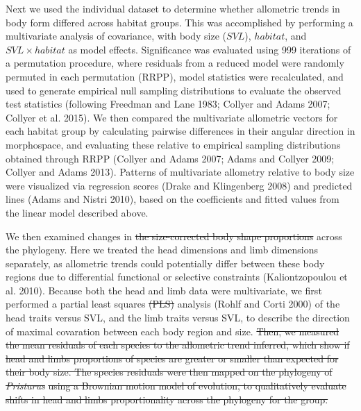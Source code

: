 \documentclass[
  11pt,
]{article}
\providecommand{\DIFaddtex}[1]{{\protect\color{blue}\uwave{#1}}} %
\providecommand{\DIFdeltex}[1]{{\protect\color{red}\sout{#1}}}                      %
\providecommand{\DIFaddbegin}{} %
\providecommand{\DIFaddend}{} %
\providecommand{\DIFdelbegin}{} %
\providecommand{\DIFdelend}{} %
\providecommand{\DIFadd}[1]{\texorpdfstring{\DIFaddtex{#1}}{#1}} %
\providecommand{\DIFdel}[1]{\texorpdfstring{\DIFdeltex{#1}}{}} %
\newcommand{\DIFscaledelfig}{0.5}
\newlength{\DIFdelgraphicswidth} %
\newlength{\DIFdelgraphicsheight} %
\newcommand{\DIFaddincludegraphics}[2][]{{\color{blue}\fbox{\DIFOincludegraphics[#1]{#2}}}} %
\newcommand{\DIFdelincludegraphics}[2][]{%
\sbox{\DIFdelgraphicsbox}{\DIFOincludegraphics[#1]{#2}}%
\settoboxwidth{\DIFdelgraphicswidth}{\DIFdelgraphicsbox} %
\settoboxtotalheight{\DIFdelgraphicsheight}{\DIFdelgraphicsbox} %
\scalebox{\DIFscaledelfig}{%
\parbox[b]{\DIFdelgraphicswidth}{\usebox{\DIFdelgraphicsbox}\\[-\baselineskip] \rule{\DIFdelgraphicswidth}{0em}}\llap{\resizebox{\DIFdelgraphicswidth}{\DIFdelgraphicsheight}{%
\setlength{\unitlength}{\DIFdelgraphicswidth}%
\begin{picture}(1,1)%
\thicklines\linethickness{2pt} %
{\color[rgb]{1,0,0}\put(0,0){\framebox(1,1){}}}%
{\color[rgb]{1,0,0}\put(0,0){\line( 1,1){1}}}%
{\color[rgb]{1,0,0}\put(0,1){\line(1,-1){1}}}%
\end{picture}%
}\hspace*{3pt}}} %
} %
\DeclareRobustCommand{\DIFaddbegin}{\DIFOaddbegin \let\includegraphics\DIFaddincludegraphics} %
\DeclareRobustCommand{\DIFaddend}{\DIFOaddend \let\includegraphics\DIFOincludegraphics} %
\DeclareRobustCommand{\DIFdelbegin}{\DIFOdelbegin \let\includegraphics\DIFdelincludegraphics} %
\DeclareRobustCommand{\DIFdelend}{\DIFOaddend \let\includegraphics\DIFOincludegraphics} %
\begin{document}
Next we used the individual dataset to determine whether allometric
trends in body form differed across habitat groups. This was
accomplished by performing a multivariate analysis of covariance, with
body size (\(SVL\)), \(habitat\), and \(SVL\times habitat\) as model
effects. Significance was evaluated using 999 iterations of a
permutation procedure, where residuals from a reduced model were
randomly permuted in each permutation (RRPP), model statistics were
recalculated, and used to generate empirical null sampling distributions
to evaluate the observed test statistics (following Freedman and Lane
1983; Collyer and Adams 2007; Collyer et al. 2015). We then compared the
multivariate allometric vectors for each habitat group by calculating
pairwise differences in their angular direction in morphospace, and
evaluating these relative to empirical sampling distributions obtained
through RRPP (Collyer and Adams 2007; Adams and Collyer 2009; Collyer
and Adams 2013). Patterns of multivariate allometry relative to body
size were visualized via regression scores (Drake and Klingenberg 2008)
and predicted lines (Adams and Nistri 2010), based on the coefficients
and fitted values from the linear model described above. \hfill\break

We then examined changes in \DIFdelbegin \DIFdel{the size-corrected body shape proportions
}\DIFdelend \DIFaddbegin \DIFadd{allometric trends }\DIFaddend across the phylogeny. Here
we treated the head dimensions and limb dimensions separately, as
allometric trends could potentially differ between these body regions
due to differential functional or selective constraints (Kaliontzopoulou
et al. 2010). Because both the head and limb data were multivariate, we
first performed a partial least squares \DIFdelbegin \DIFdel{(PLS) }\DIFdelend analysis (Rohlf and Corti 2000)
of the head traits versus SVL, and the limb traits versus SVL, to
describe the direction of maximal covaration between each body region
and size. \DIFdelbegin \DIFdel{Then, we measured the mean
residuals of each species to the allometric trend inferred, which show
if head and limbs proportions of species are greater or smaller than
expected for their body size. The species residuals were then mapped on
the phylogeny of }\emph{\DIFdel{Pristurus}} %
\DIFdel{using a Brownian motion model of
evolution, to qualitatively evaluate shifts in head and
limbs
proportionality across the phylogeny for the group. }%
\end{document}
